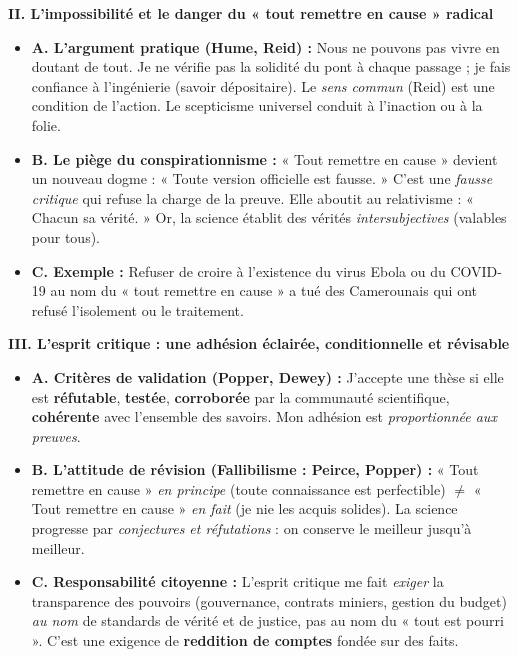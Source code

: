 \documentclass[11pt]{article}
\begin{document}
\begin{exoresolu}
\textbf{II. L'impossibilité et le danger du « tout remettre en cause » radical}
\begin{itemize}
    \item \textbf{A. L'argument pratique (Hume, Reid) :} Nous ne pouvons pas vivre en doutant de tout. Je ne vérifie pas la solidité du pont à chaque passage ; je fais confiance à l'ingénierie (savoir dépositaire). Le \emph{sens commun} (Reid) est une condition de l'action. Le scepticisme universel conduit à l'inaction ou à la folie.
    \item \textbf{B. Le piège du conspirationnisme :} « Tout remettre en cause » devient un nouveau dogme : « Toute version officielle est fausse. » C'est une \emph{fausse critique} qui refuse la charge de la preuve. Elle aboutit au relativisme : « Chacun sa vérité. » Or, la science établit des vérités \emph{intersubjectives} (valables pour tous).
    \item \textbf{C. Exemple :} Refuser de croire à l'existence du virus Ebola ou du COVID-19 au nom du « tout remettre en cause » a tué des Camerounais qui ont refusé l'isolement ou le traitement.
\end{itemize}

\textbf{III. L'esprit critique : une adhésion éclairée, conditionnelle et révisable}
\begin{itemize}
    \item \textbf{A. Critères de validation (Popper, Dewey) :} J'accepte une thèse si elle est \textbf{réfutable}, \textbf{testée}, \textbf{corroborée} par la communauté scientifique, \textbf{cohérente} avec l'ensemble des savoirs. Mon adhésion est \emph{proportionnée aux preuves}.
    \item \textbf{B. L'attitude de révision (Fallibilisme : Peirce, Popper) :} « Tout remettre en cause » \emph{en principe} (toute connaissance est perfectible) $\neq$ « Tout remettre en cause » \emph{en fait} (je nie les acquis solides). La science progresse par \emph{conjectures et réfutations} : on conserve le meilleur jusqu'à meilleur.
    \item \textbf{C. Responsabilité citoyenne :} L'esprit critique me fait \emph{exiger} la transparence des pouvoirs (gouvernance, contrats miniers, gestion du budget) \emph{au nom} de standards de vérité et de justice, pas au nom du « tout est pourri ». C'est une exigence de \textbf{reddition de comptes} fondée sur des faits.
\end{itemize}


\end{exoresolu}
\end{document}

